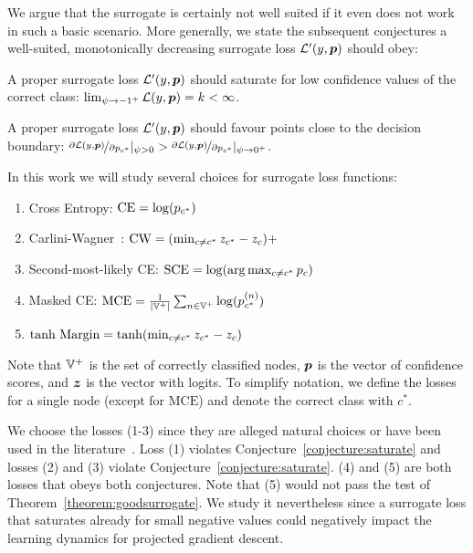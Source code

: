 \documentclass[sigconf,authordraft]{acmart}
\begin{document}
We argue that the surrogate is certainly not well suited if it even does not work in such a basic scenario. More generally, we state the subsequent conjectures a well-suited, monotonically decreasing surrogate loss \(\mathcal{L'}(y, {\bm{p}})\) should obey:
\begin{conjecture}\label{conjecture:saturate}
  A proper surrogate loss \(\mathcal{L}'(y, {\bm{p}})\) should saturate for low confidence values of the correct class: \(\lim_{\psi \to -1^+} \mathcal{L}(y, {\bm{p}}) = k < \infty\).
\end{conjecture}
\begin{conjecture}\label{conjecture:maxgrad}
  A proper surrogate loss \(\mathcal{L}'(y, {\bm{p}})\) should favour points close to the decision boundary: \(\nicefrac{\partial \mathcal{L}(y, {\bm{p}})}{\partial {p}_{c^*}} |_{\psi > 0}  > \nicefrac{\partial \mathcal{L}(y, {\bm{p}})}{\partial {p}_{c^*}} |_{\psi \to 0^+}\).
\end{conjecture}

In this work we will study several choices for surrogate loss functions:
\begin{enumerate}
  \item Cross Entropy: \(\text{CE} = \log({p}_{c^*})\)
  \item Carlini-Wagner~\cite{Carlini2017}: \(\text{CW} = (\min_{c \ne c^*} {z}_{c^*} - {z}_{c})+\)
  \item Second-most-likely CE: \(\text{SCE} = \log(\arg\max_{c \ne c^*} {p}_{c})\)
  \item Masked CE: \(\text{MCE} = \frac{1}{|{\mathbb{V}}^+|} \sum_{n \in {\mathbb{V}}^+} \log({p}_{c^*}^{(n)})\)
  \item \(\text{tanh Margin} = \tanh(\min_{c \ne c^*} {z}_{c^*} - {z}_{c})\)
\end{enumerate}
Note that \({\mathbb{V}}^+\) is the set of correctly classified nodes, \({\bm{p}}\) is the vector of confidence scores, and \({\bm{z}}\) is the vector with logits. To simplify notation, we define the losses for a single node (except for \(\text{MCE}\)) and denote the correct class with \(c^*\). 

We choose the losses (1-3) since they are alleged natural choices or have been used in the literature~\citep{Chen2018, Wu2019, Xu2018, Zugner2019a}. Loss (1) violates Conjecture~\ref{conjecture:saturate} and losses (2) and (3) violate Conjecture~\ref{conjecture:saturate}. (4) and (5) are both losses that obeys both conjectures. Note that (5) would not pass the test of Theorem~\ref{theorem:goodsurrogate}. We study it nevertheless since a surrogate loss that saturates already for small negative values could negatively impact the learning dynamics for projected gradient descent.
\end{document}
